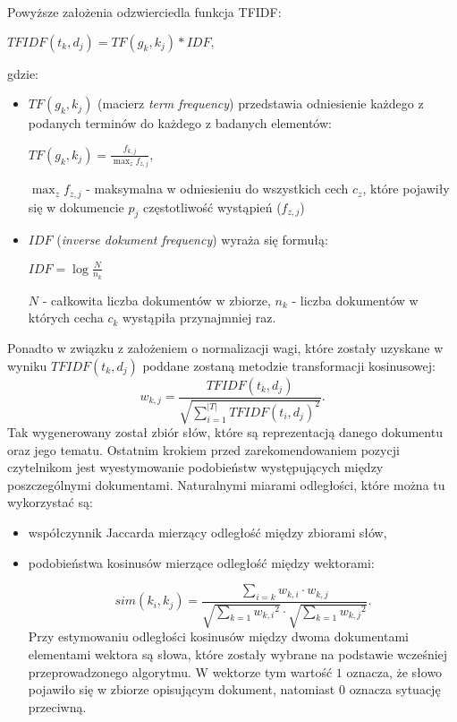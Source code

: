 \documentclass[12pt,a4paper]{report}
\begin{document}
Powyższe założenia odzwierciedla funkcja TFIDF:
\begin{center}
\begin{math}
TFIDF(t_k, d_j) = TF(g_k, k_j) * IDF,
\end{math}
\end{center}
gdzie:
\begin{itemize}
\item \begin{math}TF(g_k, k_j)  \end{math} (macierz \textit{term frequency}) przedstawia odniesienie każdego z podanych terminów do każdego z badanych elementów:
\begin{center}
\begin{math}
TF(g_k, k_j)=\frac{f_{k,j}}{\max_{z}f_{z,j}},
\end{math}
\end{center}
$\max_{z}f_{z,j}$ - maksymalna w odniesieniu do wszystkich cech $c_z$, które pojawiły się w dokumencie $p_j$ częstotliwość wystąpień ($f_{z,j}$) 

\item \begin{math}IDF \end{math} (\textit{inverse dokument frequency}) wyraża się formułą:
\begin{center}
\begin{math}IDF = \log \frac{N}{n_k} \end{math}
\end{center}
$N$ - całkowita liczba dokumentów w zbiorze,
$n_k$ - liczba dokumentów w których cecha $c_k$ wystąpiła przynajmniej raz.
\end{itemize}
Ponadto w związku z założeniem o normalizacji wagi, które zostały uzyskane w wyniku \begin{math}
TFIDF(t_k, d_j)
\end{math} poddane zostaną metodzie transformacji kosinusowej: 
$$w_{k,j} = \frac{TFIDF(t_k, d_j)}{\sqrt{ \sum_{i=1}^{|T|}{TFIDF(t_i, d_j)}^2}}.$$
Tak wygenerowany został zbiór słów, które są reprezentacją danego dokumentu oraz jego tematu. Ostatnim krokiem przed zarekomendowaniem pozycji czytelnikom jest wyestymowanie podobieństw występujących między poszczególnymi dokumentami. Naturalnymi miarami odległości, które można tu wykorzystać są:
\begin{itemize}
\item współczynnik Jaccarda mierzący odległość między zbiorami słów,
\item podobieństwa kosinusów mierzące odległość między wektorami:

$$
sim(k_i,k_j) = \frac{\sum_{i=k} w_{k,i}\cdot w_{k,j}}{\sqrt{\sum_{k=1}{w_{k,i}}^2} \cdot \sqrt{\sum_{k=1}{w_{k,j}}^2}}.
$$
Przy estymowaniu odległości kosinusów między dwoma dokumentami elementami wektora są słowa, które zostały wybrane na podstawie wcześniej przeprowadzonego algorytmu. W wektorze tym wartość $1$ oznacza, że słowo pojawiło się w zbiorze opisującym dokument, natomiast $0$ oznacza sytuację przeciwną.
\end{itemize}
\end{document}

